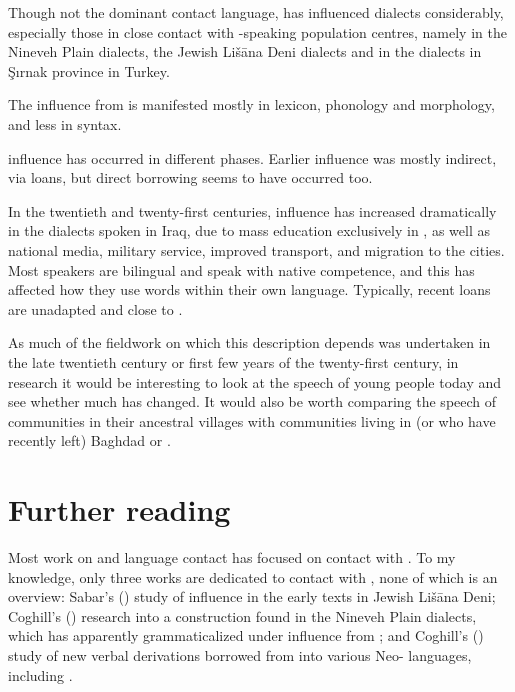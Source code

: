 \documentclass[output=paper]{langsci/langscibook}
\begin{document}
Though not the dominant contact language,  has influenced  dialects considerably, especially those in close contact with -speaking population centres, namely in the  Nineveh Plain dialects, the Jewish Lišāna Deni dialects and in the  dialects in Şırnak province in Turkey.

The influence from  is manifested mostly in lexicon, phonology and morphology, and less in syntax.

 influence has occurred in different phases. Earlier  influence was mostly indirect, via  loans, but direct borrowing seems to have occurred too.

In the twentieth and twenty-first centuries,  influence has increased dramatically in the dialects spoken in Iraq, due to mass education exclusively in , as well as national media, military service, improved transport, and migration to the  cities. Most  speakers are bilingual and speak  with native competence, and this has affected how they use  words within their own language. Typically, recent loans are unadapted and close to .

As much of the fieldwork on which this description depends was undertaken in the late twentieth century or first few years of the twenty-first century, in  research it would be interesting to look at the speech of young people today and see whether much has changed. It would also be worth comparing the speech of communities in their ancestral villages with  communities living in (or who have recently left) Baghdad or .

\section*{Further reading}

Most work on  and language contact has focused on contact with . To my knowledge, only three works are dedicated to contact with , none of which is an overview: Sabar's (\citeyear{Sabar1984}) study of  influence in the early texts in Jewish Lišāna Deni; Coghill’s (\citeyear{Coghill2010,Coghill2012}) research into a  construction found in the  Nineveh Plain dialects, which has apparently grammaticalized under influence from ; and Coghill's (\citeyear{Coghill2015}) study of new verbal derivations borrowed from  into various Neo- languages, including .
\end{document}
